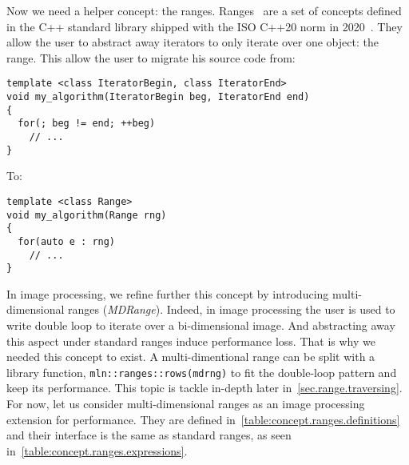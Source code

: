 Now we need a helper concept: the ranges.
Ranges~\parencite{niebler.2014.ranges,niebler.2018.ranges,niebler.2018.deepranges,niebler.2018.mergingranges} are a set
of concepts defined in the C++ standard library shipped with the ISO C++20 norm in 2020~\parencite{iso.2020.cpp}. They
allow the user to abstract away iterators to only iterate over one object: the range. This allow the user to migrate his
source code from:
\begin{verbatim}
template <class IteratorBegin, class IteratorEnd>
void my_algorithm(IteratorBegin beg, IteratorEnd end)
{
  for(; beg != end; ++beg)
    // ...
}
\end{verbatim}
To:
\begin{verbatim}
template <class Range>
void my_algorithm(Range rng)
{
  for(auto e : rng)
    // ...
}
\end{verbatim}

In image processing, we refine further this concept by introducing multi-dimensional ranges (\emph{MDRange}). Indeed, in
image processing the user is used to write double loop to iterate over a bi-dimensional image. And abstracting away this
aspect under standard ranges induce performance loss. That is why we needed this concept to exist. A multi-dimentional
range can be split with a library function, \texttt{mln::ranges::rows(mdrng)} to fit the double-loop pattern and keep
its performance. This topic is tackle in-depth later in~\cref{sec.range.traversing}. For now, let us consider
multi-dimensional ranges as an image processing extension for performance. They are defined
in~\cref{table:concept.ranges.definitions} and their interface is the same as standard ranges, as seen
in~\cref{table:concept.ranges.expressions}.

